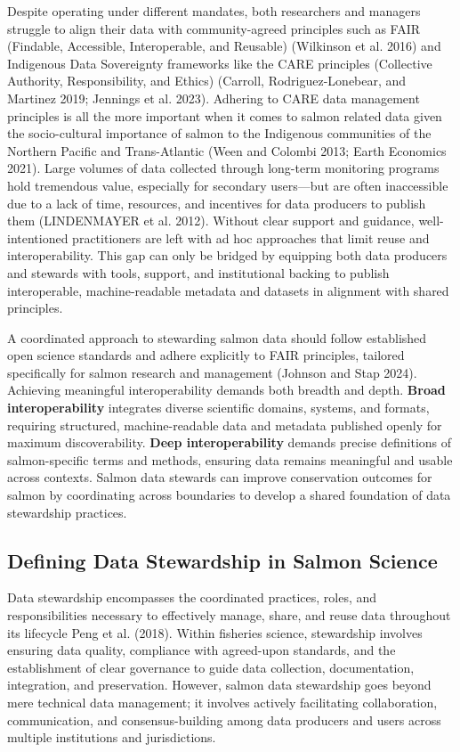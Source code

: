 \documentclass[
  letterpaper,
  DIV=11,
  numbers=noendperiod]{scrartcl}
\begin{document}
Despite operating under different mandates, both researchers and
managers struggle to align their data with community-agreed principles
such as FAIR (Findable, Accessible, Interoperable, and Reusable)
(Wilkinson et al. 2016) and Indigenous Data Sovereignty frameworks like
the CARE principles (Collective Authority, Responsibility, and Ethics)
(Carroll, Rodriguez-Lonebear, and Martinez 2019; Jennings et al. 2023).
Adhering to CARE data management principles is all the more important
when it comes to salmon related data given the socio-cultural importance
of salmon to the Indigenous communities of the Northern Pacific and
Trans-Atlantic (Ween and Colombi 2013; Earth Economics 2021). Large
volumes of data collected through long-term monitoring programs hold
tremendous value, especially for secondary users---but are often
inaccessible due to a lack of time, resources, and incentives for data
producers to publish them (LINDENMAYER et al. 2012). Without clear
support and guidance, well-intentioned practitioners are left with ad
hoc approaches that limit reuse and interoperability. This gap can only
be bridged by equipping both data producers and stewards with tools,
support, and institutional backing to publish interoperable,
machine-readable metadata and datasets in alignment with shared
principles.

A coordinated approach to stewarding salmon data should follow
established open science standards and adhere explicitly to FAIR
principles, tailored specifically for salmon research and management
(Johnson and Stap 2024). Achieving meaningful interoperability demands
both breadth and depth. \textbf{Broad interoperability} integrates
diverse scientific domains, systems, and formats, requiring structured,
machine-readable data and metadata published openly for maximum
discoverability. \textbf{Deep interoperability} demands precise
definitions of salmon-specific terms and methods, ensuring data remains
meaningful and usable across contexts. Salmon data stewards can improve
conservation outcomes for salmon by coordinating across boundaries to
develop a shared foundation of data stewardship practices.

\subsection{Defining Data Stewardship in Salmon
Science}\label{defining-data-stewardship-in-salmon-science}

Data stewardship encompasses the coordinated practices, roles, and
responsibilities necessary to effectively manage, share, and reuse data
throughout its lifecycle Peng et al. (2018). Within fisheries science,
stewardship involves ensuring data quality, compliance with agreed-upon
standards, and the establishment of clear governance to guide data
collection, documentation, integration, and preservation. However,
salmon data stewardship goes beyond mere technical data management; it
involves actively facilitating collaboration, communication, and
consensus-building among data producers and users across multiple
institutions and jurisdictions.
\end{document}
